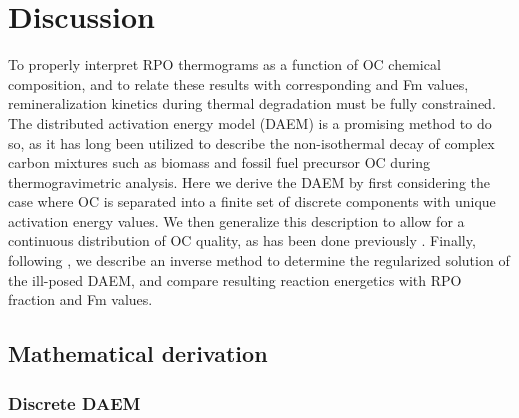 \section{Discussion}

To properly interpret RPO thermograms as a function of OC chemical composition, and to relate these results with corresponding  and Fm values, remineralization kinetics during thermal degradation must be fully constrained. The distributed activation energy model (DAEM) is a promising method to do so, as it has long been utilized to describe the non-isothermal decay of complex carbon mixtures such as biomass \citep[\textit{e.g.}][]{Bradbury:1979to,White:2011iz} and fossil fuel precursor OC \citep[\textit{e.g.}][]{Burnham:1987ut,Braun:1987vf,Burnham:1999ec,Cramer:2004tg,Dieckmann:2005dw} during thermogravimetric analysis. Here we derive the DAEM  by first considering the case where OC is separated into a finite set of discrete components with unique activation energy values. We then generalize this description to allow for a continuous distribution of OC quality, as has been done previously \citep[see][for review]{Burnham:1999ec}. Finally, following \citet{Forney:2012dr,Forney:2012hz}, we describe an inverse method to determine the regularized solution of the ill-posed DAEM, and compare resulting reaction energetics with RPO fraction  and Fm values.

\subsection{Mathematical derivation}

\subsubsection{Discrete DAEM}

